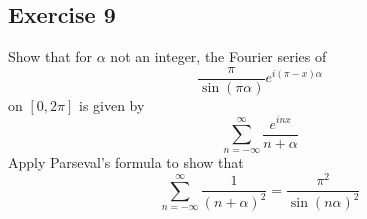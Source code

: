 \documentclass[12pt]{article}
\begin{document}
\subsection*{Exercise 9}
Show that for $\alpha$ not an integer, the Fourier series of
\begin{equation*}
    \frac{\pi}{\sin(\pi\alpha)}e^{i(\pi-x)\alpha}
\end{equation*}
on $[0,2\pi]$ is given by
\begin{equation*}
    \sum_{n=-\infty}^{\infty}\frac{e^{inx}}{n+\alpha}
\end{equation*}
Apply Parseval's formula to show that
\begin{equation*}
    \sum_{n=-\infty}^{\infty}\frac{1}{(n+\alpha)^2}=\frac{\pi^2}{\sin(n\alpha)^2}
\end{equation*}
\vspace{2em}
\end{document}
